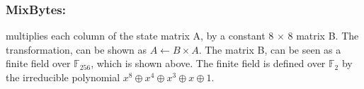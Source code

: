   \subsubsection{MixBytes:} multiplies each column of the state matrix A, by a constant 8 $\times$ 8 matrix B.
  The transformation, can be shown as $ A \gets B \times A$. The matrix B, can be seen as a finite field over 
  $\mathbb{F}_{256}$, which is shown above. The finite field is defined over 
  $\mathbb{F}_{2}$ by the irreducible polynomial $x^{8} \oplus x^{4} \oplus x^{3} \oplus x \oplus 1$.
